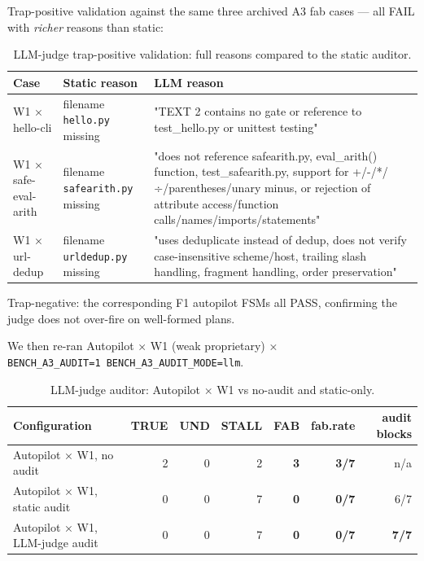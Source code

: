 Trap-positive validation against the same three archived A3 fab cases --- all FAIL with
\emph{richer} reasons than static:

{\scriptsize\begin{longtable}[]{@{}l l p{}@{}}
\caption{LLM-judge trap-positive validation: full reasons compared to the static auditor.}\label{tab:llm-judge-cases}\\
\toprule\noalign{}
Case & Static reason & LLM reason \\
\midrule\noalign{}
\endhead
\bottomrule\noalign{}
\endlastfoot
W1 × hello-cli & filename \texttt{hello.py} missing & "TEXT 2 contains no gate or reference to test\_hello.py or unittest testing" \\
W1 × safe-eval-arith & filename \texttt{safearith.py} missing & "does not reference safearith.py, eval\_arith() function, test\_safearith.py, support for +/-/*/÷/parentheses/unary minus, or rejection of attribute access/function calls/names/imports/statements" \\
W1 × url-dedup & filename \texttt{urldedup.py} missing & "uses deduplicate instead of dedup, does not verify case-insensitive scheme/host, trailing slash handling, fragment handling, order preservation" \\
\end{longtable}}

Trap-negative: the corresponding F1 autopilot FSMs all PASS, confirming the judge does
not over-fire on well-formed plans.

We then re-ran Autopilot × W1 (weak proprietary) × \texttt{BENCH\_A3\_AUDIT=1\ BENCH\_A3\_AUDIT\_MODE=llm}.

{\scriptsize\begin{longtable}[]{@{}lrrrrrr@{}}
\caption{LLM-judge auditor: Autopilot $\times$ W1 vs no-audit and static-only.}\label{tab:llm-judge-w1}\\
\toprule\noalign{}
Configuration & TRUE & UND & STALL & FAB & fab.rate & audit blocks \\
\midrule\noalign{}
\endhead
\bottomrule\noalign{}
\endlastfoot
Autopilot × W1, no audit & 2 & 0 & 2 & \textbf{3} & \textbf{3/7} & n/a \\
Autopilot × W1, static audit & 0 & 0 & 7 & \textbf{0} & \textbf{0/7} & 6/7 \\
Autopilot × W1, LLM-judge audit & 0 & 0 & 7 & \textbf{0} & \textbf{0/7} & \textbf{7/7} \\
\end{longtable}}

